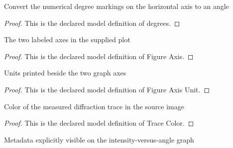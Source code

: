 \begin{definition}[degrees]
  \label{def:physics:phyx-mini-0082:phyxminiproblems-problemphyxmini0082-degrees}
  Convert the numerical degree markings on the horizontal axis to an angle
\end{definition}
\begin{proof}
  This is the declared model definition of degrees.
\end{proof}
\begin{definition}
  \label{def:physics:phyx-mini-0082:phyxminiproblems-problemphyxmini0082-figureaxis}
  The two labeled axes in the supplied plot
\end{definition}
\begin{proof}
  This is the declared model definition of Figure Axis.
\end{proof}
\begin{definition}
  \label{def:physics:phyx-mini-0082:phyxminiproblems-problemphyxmini0082-figureaxisunit}
  Units printed beside the two graph axes
\end{definition}
\begin{proof}
  This is the declared model definition of Figure Axis Unit.
\end{proof}
\begin{definition}
  \label{def:physics:phyx-mini-0082:phyxminiproblems-problemphyxmini0082-tracecolor}
  Color of the measured diffraction trace in the source image
\end{definition}
\begin{proof}
  This is the declared model definition of Trace Color.
\end{proof}
\begin{definition}
  \label{def:physics:phyx-mini-0082:phyxminiproblems-problemphyxmini0082-diffractiongraph}
  Metadata explicitly visible on the intensity-versus-angle graph
\end{definition}

